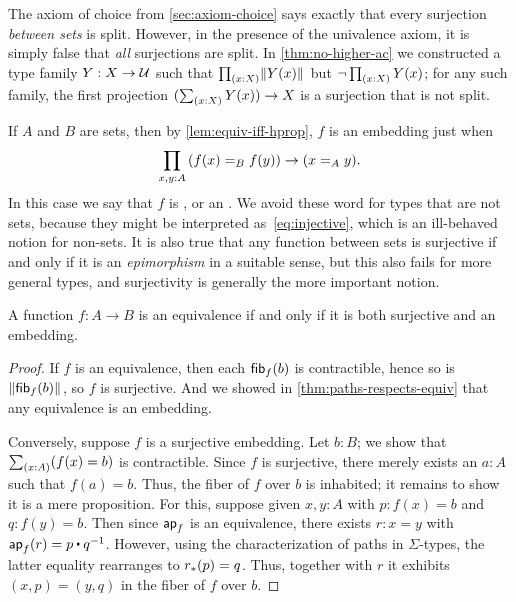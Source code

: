 The axiom of choice from \cref{sec:axiom-choice} says exactly that every surjection \emph{between sets} is split.
However, in the presence of the univalence axiom, it is simply false that \emph{all} surjections are split.
In \cref{thm:no-higher-ac} we constructed a type family $Y:X\to \mathcal{U}$ such that $\prd{x:X} \brck{Y(x)}$ but $\neg \prd{x:X} Y(x)$;
for any such family, the first projection $(\sm{x:X} Y(x)) \to X$ is a surjection that is not split.

If $A$ and $B$ are sets, then by \cref{lem:equiv-iff-hprop}, $f$ is an embedding just when
\begin{equation}
  \prd{x,y:A} (\id[B]{f(x)}{f(y)}) \to (\id[A]xy).\label{eq:injective}
\end{equation}
In this case we say that $f$ is ,
%
%
or an .
%
We avoid these word for types that are not sets, because they might be interpreted as~\eqref{eq:injective}, which is an ill-behaved notion for non-sets.
It is also true that any function between sets is surjective if and only if it is an \emph{epimorphism} in a suitable sense, but this also fails for more general types, and surjectivity is generally the more important notion.

\begin{thm}\label{thm:mono-surj-equiv}
  A function $f:A\to B$ is an equivalence if and only if it is both surjective and an embedding.
\end{thm}
\begin{proof}
  If $f$ is an equivalence, then each ${\mathsf{fib}}_{f}(b)$ is contractible, hence so is $\mathopen{}\left\Vert {\mathsf{fib}}_{f}(b)\right\Vert_{}\mathclose{}$, so $f$ is surjective.
  And we showed in \cref{thm:paths-respects-equiv} that any equivalence is an embedding.

  Conversely, suppose $f$ is a surjective embedding.
  Let $b:B$; we show that $\sm{x:A}(f(x)=b)$ is contractible.
  Since $f$ is surjective, there merely exists an $a:A$ such that $f(a)=b$.
  Thus, the fiber of $f$ over $b$ is inhabited; it remains to show it is a mere proposition.
  For this, suppose given $x,y:A$ with $p:f(x)=b$ and $q:f(y)=b$.
  Then since $\mathsf{ap}_{f}$ is an equivalence, there exists $r:x=y$ with $\apfunc f (r) = p \ct \opp q$.
  However, using the characterization of paths in $\Sigma$-types, the latter equality rearranges to ${r}_{*}\mathopen{}\left({p}\right)\mathclose{} = q$.
  Thus, together with $r$ it exhibits $(x,p) = (y,q)$ in the fiber of $f$ over $b$.
\end{proof}

